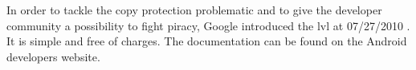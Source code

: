 In order to tackle the copy protection problematic and to give the developer community a possibility to fight piracy, Google introduced the \gls{lvl} at 07/27/2010 \cite{developersLicensingBlog}.
It is simple and free of charges. The documentation can be found on the Android developers website. \cite{developersLicensingOverview}
